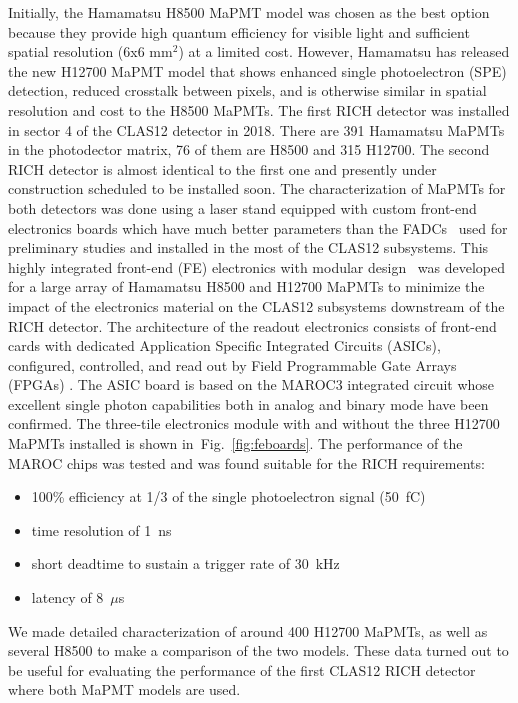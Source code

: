 Initially, the Hamamatsu H8500 MaPMT model \cite{H8500} was chosen as the best option because they provide high quantum efficiency for visible light and sufficient spatial resolution (6x6 mm$^2$) at a limited cost.
However, Hamamatsu has released the new H12700 MaPMT model  \cite{H12700} that shows enhanced single photoelectron (SPE) detection, reduced crosstalk between pixels, and is otherwise similar in spatial resolution and  cost to the H8500 MaPMTs.
The first RICH detector was installed in sector 4 of the CLAS12 detector in 2018.
There are 391 Hamamatsu MaPMTs  in the photodector matrix, 76 of them are H8500 and 315 H12700. 
The second RICH detector is almost identical to the first one and presently under construction scheduled to be installed soon.
The characterization of MaPMTs for both detectors was done using a laser stand equipped with custom front-end electronics boards which have much better parameters than the FADCs~\cite{FADC250} used for preliminary studies and installed in the most of the CLAS12 subsystems.
This highly integrated front-end (FE) electronics with modular design~\cite{RICH_FE} was developed for a large array of Hamamatsu H8500 and H12700 MaPMTs to minimize the impact of the electronics material on the CLAS12 subsystems downstream of the RICH detector.
The architecture of the readout electronics consists of front-end cards with dedicated Application Specific Integrated Circuits (ASICs), configured, controlled, and read out by Field Programmable Gate Arrays (FPGAs) \cite{RICH_FE}.
The ASIC board is based on the MAROC3  integrated circuit \cite{MAROC} whose excellent single photon capabilities both in analog and binary mode have been confirmed.
The three-tile electronics module with and without the three H12700 MaPMTs installed is shown in~Fig.~\ref{fig:feboards}.
The performance of the MAROC chips was tested and was found suitable for the RICH requirements:
\begin{itemize}
	\item 100\% efficiency at 1/3 of the single photoelectron signal (50~fC)
	\item time resolution of 1~ns
	\item short deadtime to sustain a trigger rate of 30~kHz
	\item latency of 8~$\mu$s
\end{itemize}
We made detailed characterization of around 400 H12700 MaPMTs, as well as several H8500 to make a comparison of the two models.
These data turned out to be useful for evaluating the performance of the first CLAS12 RICH detector where both MaPMT models are used.
